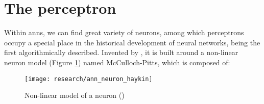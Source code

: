 


                                                                                    


\section{The perceptron}
\label{sec:perceptron}
Within \glspl{ann}, we can find great variety of neurons, among which perceptrons occupy a special place in the historical development of neural networks, being the first algorithmically described. Invented by \cite{rosenblatt1958perceptron}, it is built around a non-linear neuron model (Figure \ref{fig:nonlinear_neuron_model}) named McCulloch-Pitts, which is composed of:

\begin{figure}[!ht]
	\centering
	\texttt{[image: research/ann\_neuron\_haykin]}
	\caption{Non-linear model of a neuron (\cite{haykin2009neural})}
	\label{fig:nonlinear_neuron_model}
\end{figure}


